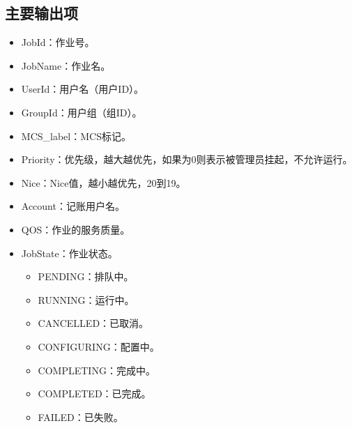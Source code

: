 \documentclass[a4paper,12pt,english]{sphinxmanual}
\begin{document}
\subsection{主要输出项}
\label{\detokenize{slurm/slurm:id17}}\label{\detokenize{slurm/slurm:id18}}\begin{itemize}
\item {} 
\sphinxAtStartPar
JobId：作业号。

\item {} 
\sphinxAtStartPar
JobName：作业名。

\item {} 
\sphinxAtStartPar
UserId：用户名（用户ID）。

\item {} 
\sphinxAtStartPar
GroupId：用户组（组ID）。

\item {} 
\sphinxAtStartPar
MCS\_label：MCS标记。

\item {} 
\sphinxAtStartPar
Priority：优先级，越大越优先，如果为0则表示被管理员挂起，不允许运行。

\item {} 
\sphinxAtStartPar
Nice：Nice值，越小越优先，\sphinxhyphen{}20到19。

\item {} 
\sphinxAtStartPar
Account：记账用户名。

\item {} 
\sphinxAtStartPar
QOS：作业的服务质量。

\item {} 
\sphinxAtStartPar
JobState：作业状态。
\begin{itemize}
\item {} 
\sphinxAtStartPar
PENDING：排队中。

\item {} 
\sphinxAtStartPar
RUNNING：运行中。

\item {} 
\sphinxAtStartPar
CANCELLED：已取消。

\item {} 
\sphinxAtStartPar
CONFIGURING：配置中。

\item {} 
\sphinxAtStartPar
COMPLETING：完成中。

\item {} 
\sphinxAtStartPar
COMPLETED：已完成。

\item {} 
\sphinxAtStartPar
FAILED：已失败。


\end{itemize}
\end{itemize}
\end{document}
